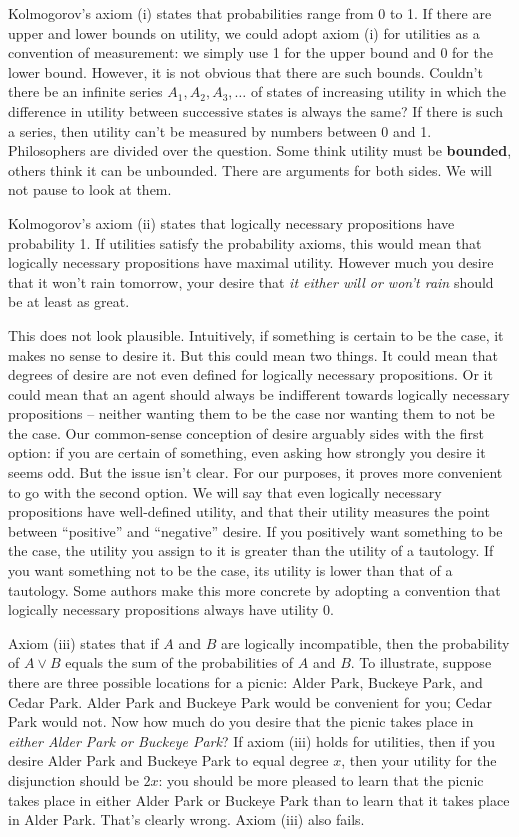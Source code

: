 Kolmogorov's axiom (i) states that probabilities range from 0 to 1. If there are
upper and lower bounds on utility, we could adopt axiom (i) for utilities as a
convention of measurement: we simply use 1 for the upper bound and 0 for the
lower bound. However, it is not obvious that there are such bounds. Couldn't
there be an infinite series $A_1, A_2, A_3, \ldots$ of states of increasing
utility in which the difference in utility between successive states is always
the same? If there is such a series, then utility can't be measured by numbers
between 0 and 1. Philosophers are divided over the question. Some think utility
must be \textbf{bounded}, others think it can be unbounded. There are arguments
for both sides. We will not pause to look at them.

Kolmogorov's axiom (ii) states that logically necessary propositions have
probability 1. If utilities satisfy the probability axioms, this would mean that
logically necessary propositions have maximal utility. However much you desire
that it won't rain tomorrow, your desire that \emph{it either will or won't
  rain} should be at least as great.

This does not look plausible. Intuitively, if something is certain to be the
case, it makes no sense to desire it. But this could mean two things. It could
mean that degrees of desire are not even defined for logically necessary
propositions. Or it could mean that an agent should always be indifferent
towards logically necessary propositions -- neither wanting them to be the case
nor wanting them to not be the case. Our common-sense conception of desire
arguably sides with the first option: if you are certain of something, even
asking how strongly you desire it seems odd. But the issue isn't clear. For our
purposes, it proves more convenient to go with the second option. We will say
that even logically necessary propositions have well-defined utility, and that
their utility measures the point between ``positive'' and ``negative'' desire.
If you positively want something to be the case, the utility you assign to it is
greater than the utility of a tautology. If you want something not to be the
case, its utility is lower than that of a tautology. Some authors make this more
concrete by adopting a convention that logically necessary propositions always
have utility 0.\label{utility0}

Axiom (iii) states that if $A$ and $B$ are logically incompatible, then the
probability of $A\lor B$ equals the sum of the probabilities of $A$ and $B$. To
illustrate, suppose there are three possible locations for a picnic: Alder Park,
Buckeye Park, and Cedar Park. Alder Park and Buckeye Park would be convenient
for you; Cedar Park would not. Now how much do you desire that the picnic takes
place in \emph{either Alder Park or Buckeye Park}? If axiom (iii) holds for
utilities, then if you desire Alder Park and Buckeye Park to equal degree $x$,
then your utility for the disjunction should be $2x$: you should be more pleased
to learn that the picnic takes place in either Alder Park or Buckeye Park than
to learn that it takes place in Alder Park. That's clearly wrong. Axiom (iii)
also fails.

